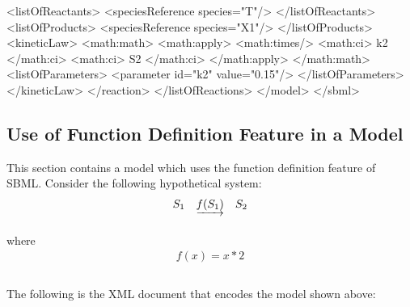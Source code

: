 \documentclass[10pt]{cekarticle}
\begin{document}
\begin{example}
                <listOfReactants>
                    <speciesReference species="T"/>
                </listOfReactants>
                <listOfProducts>
                    <speciesReference species="X1"/>
                </listOfProducts>
                <kineticLaw>
                    <math:math>
                        <math:apply>
                            <math:times/>
                            <math:ci> k2 </math:ci>
                            <math:ci> S2 </math:ci>
                        </math:apply>
                    </math:math>
                    <listOfParameters>
                        <parameter id="k2" value="0.15"/>
                    </listOfParameters>
                </kineticLaw>
            </reaction>
        </listOfReactions>
    </model>
</sbml>
\end{example}

\subsection{Use of Function Definition Feature in a Model}
\label{sec:functioneg}

This section contains a model which uses the function definition
feature of SBML.  Consider the following hypothetical system:
\begin{equation*}
  \begin{array}{@{}ccc@{}}
    S_1 & \underrightarrow{f(S_1)} & S_2 \\ \\[-4pt]
  \end{array}
\end{equation*}
where
\begin{equation*}
  \begin{array}{l}
    f(x) = x * 2 \\ \\[-4pt]
  \end{array}
\end{equation*}

The following is the XML document that encodes the model shown
above:
\end{document}
